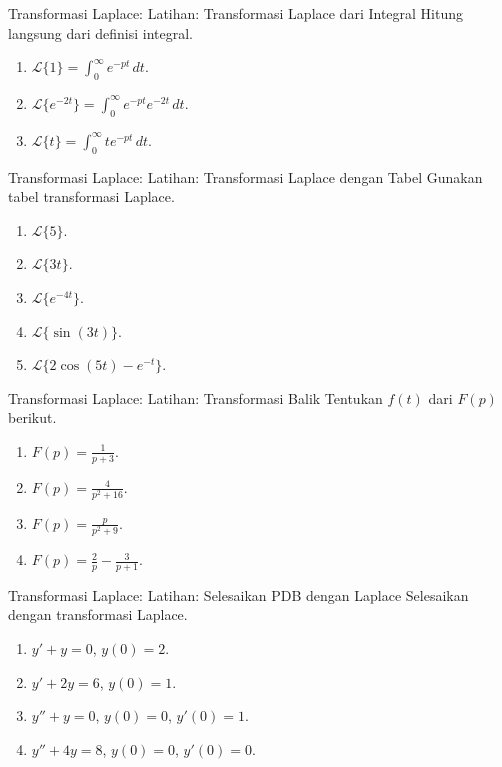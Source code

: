 \documentclass[aspectratio=169,11pt]{beamer}
\newcommand{\Lap}{\mathcal{L}}
\begin{document}
\begin{frame}{Transformasi Laplace: Latihan: Transformasi Laplace dari Integral}
Hitung langsung dari definisi integral.
\begin{enumerate}
  \item $\displaystyle \Lap\{1\}=\int_0^\infty e^{-pt}\,dt$.
  \item $\displaystyle \Lap\{e^{-2t}\}=\int_0^\infty e^{-pt}e^{-2t}\,dt$.
  \item $\displaystyle \Lap\{t\}=\int_0^\infty te^{-pt}\,dt$.
\end{enumerate}
\end{frame}

\begin{frame}{Transformasi Laplace: Latihan: Transformasi Laplace dengan Tabel}
Gunakan tabel transformasi Laplace.
\begin{enumerate}
  \item $\Lap\{5\}$.
  \item $\Lap\{3t\}$.
  \item $\Lap\{e^{-4t}\}$.
  \item $\Lap\{\sin(3t)\}$.
  \item $\Lap\{2\cos(5t)-e^{-t}\}$.
\end{enumerate}
\end{frame}

\begin{frame}{Transformasi Laplace: Latihan: Transformasi Balik}
Tentukan $f(t)$ dari $F(p)$ berikut.
\begin{enumerate}
  \item $\displaystyle F(p)=\frac{1}{p+3}$.
  \item $\displaystyle F(p)=\frac{4}{p^2+16}$.
  \item $\displaystyle F(p)=\frac{p}{p^2+9}$.
  \item $\displaystyle F(p)=\frac{2}{p}-\frac{3}{p+1}$.
\end{enumerate}
\end{frame}

\begin{frame}{Transformasi Laplace: Latihan: Selesaikan PDB dengan Laplace}
Selesaikan dengan transformasi Laplace.
\begin{enumerate}
  \item $y'+y=0$, $y(0)=2$.
  \item $y'+2y=6$, $y(0)=1$.
  \item $y''+y=0$, $y(0)=0$, $y'(0)=1$.
  \item $y''+4y=8$, $y(0)=0$, $y'(0)=0$.
\end{enumerate}
\end{frame}
\end{document}
